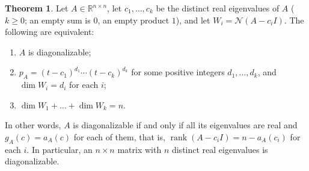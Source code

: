 \documentclass[12pt]{article}
\newcommand{\R}{\mathbb R}
\DeclareMathOperator{\rank}{rank}
\theoremstyle{definition}
\newtheorem{theorem}{Theorem}
\begin{document}
\begin{theorem}\label{r7-thm-diag-criterion}
Let \(A\in\R^{n\times n}\), let \(c_1,\dots,c_k\) be the distinct real eigenvalues of \(A\) (\(k\geqslant0\); an empty sum
is \(0\), an empty product \(1\)), and let \(W_i=\mathcal N(A-c_iI)\). The following are equivalent:
\begin{enumerate}[label=(\roman*)]
\item \(A\) is diagonalizable;
\item \(p_A=(t-c_1)^{d_1}\cdots(t-c_k)^{d_k}\) for some positive integers \(d_1,\dots,d_k\), and \(\dim W_i=d_i\) for each
\(i\);
\item \(\dim W_1+\dots+\dim W_k=n\).
\end{enumerate}
In other words, \(A\) is diagonalizable if and only if all its eigenvalues are real and \(g_A(c)=a_A(c)\) for each of
them, that is, \(\rank(A-c_iI)=n-a_A(c_i)\) for each \(i\). In particular, an \(n\times n\) matrix with \(n\) distinct real
eigenvalues is diagonalizable.
\end{theorem}
\end{document}
